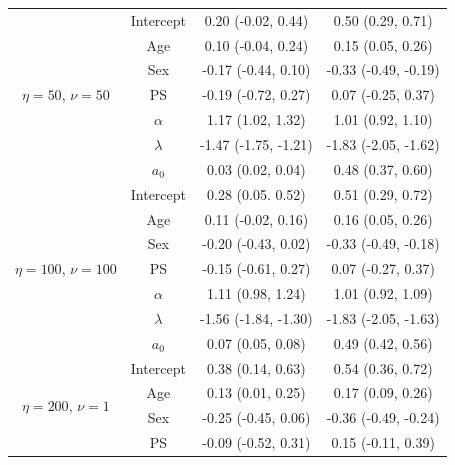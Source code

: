 \documentclass[a4paper, notitlepage, 11pt]{article}
\begin{document}
\begin{table}[!ht]
\begin{tabular}{cccc}
\multirow{7}{*}{$\eta = 50$, $\nu  = 50$}   & Intercept & 0.20 (-0.02, 0.44)   & 0.50 (0.29, 0.71)           \\
                                            & Age       & 0.10 (-0.04, 0.24)   & 0.15 (0.05, 0.26)           \\
                                            & Sex    & -0.17 (-0.44, 0.10)  & -0.33 (-0.49, -0.19)         \\
                                            & PS        & -0.19 (-0.72, 0.27)  & 0.07 (-0.25, 0.37)          \\
                                            & $\alpha$  & 1.17 (1.02, 1.32)    & 1.01 (0.92, 1.10)           \\
                                            & $\lambda$ & -1.47 (-1.75, -1.21) & -1.83 (-2.05, -1.62)        \\
                                            & $a_0$     & 0.03 (0.02, 0.04)    & 0.48 (0.37, 0.60)           \\
\multirow{7}{*}{$\eta = 100$, $\nu  = 100$} & Intercept & 0.28 (0.05. 0.52)    & 0.51 (0.29, 0.72)           \\
                                            & Age       & 0.11 (-0.02, 0.16)   & 0.16 (0.05, 0.26)           \\
                                            & Sex    & -0.20 (-0.43, 0.02)  & -0.33 (-0.49, -0.18)        \\
                                            & PS        & -0.15 (-0.61, 0.27)  & 0.07 (-0.27, 0.37)          \\
                                            & $\alpha$  & 1.11 (0.98, 1.24)    & 1.01 (0.92, 1.09)           \\
                                            & $\lambda$ & -1.56 (-1.84, -1.30) & -1.83 (-2.05, -1.63)        \\
                                            & $a_0$     & 0.07 (0.05, 0.08)    & 0.49 (0.42, 0.56)           \\
\multirow{7}{*}{$\eta = 200$, $\nu  = 1$}   & Intercept & 0.38 (0.14, 0.63)    & 0.54 (0.36, 0.72)           \\
                                            & Age       & 0.13 (0.01, 0.25)    & 0.17 (0.09, 0.26)           \\
                                            & Sex    & -0.25 (-0.45, 0.06)  & -0.36 (-0.49, -0.24)        \\
                                            & PS        & -0.09 (-0.52, 0.31)  & 0.15 (-0.11, 0.39)          \\

\end{tabular}
\end{table}
\end{document}
